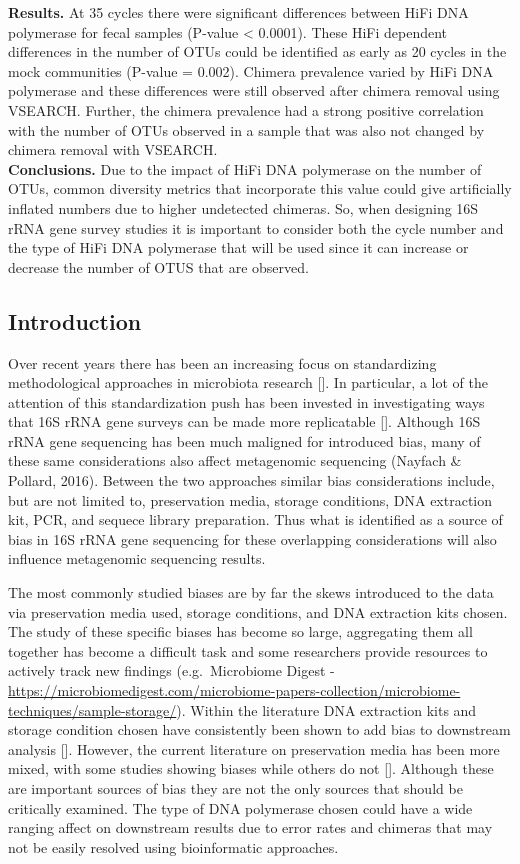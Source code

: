 \documentclass[12pt,]{article}
\begin{document}
\textbf{Results.} At 35 cycles there were significant differences
between HiFi DNA polymerase for fecal samples (P-value \textless{}
0.0001). These HiFi dependent differences in the number of OTUs could be
identified as early as 20 cycles in the mock communities (P-value =
0.002). Chimera prevalence varied by HiFi DNA polymerase and these
differences were still observed after chimera removal using VSEARCH.
Further, the chimera prevalence had a strong positive correlation with
the number of OTUs observed in a sample that was also not changed by
chimera removal with VSEARCH.\\
\textbf{Conclusions.} Due to the impact of HiFi DNA polymerase on the
number of OTUs, common diversity metrics that incorporate this value
could give artificially inflated numbers due to higher undetected
chimeras. So, when designing 16S rRNA gene survey studies it is
important to consider both the cycle number and the type of HiFi DNA
polymerase that will be used since it can increase or decrease the
number of OTUS that are observed.

\newpage

\subsection{Introduction}\label{introduction}

Over recent years there has been an increasing focus on standardizing
methodological approaches in microbiota research {[}{]}. In particular,
a lot of the attention of this standardization push has been invested in
investigating ways that 16S rRNA gene surveys can be made more
replicatable {[}{]}. Although 16S rRNA gene sequencing has been much
maligned for introduced bias, many of these same considerations also
affect metagenomic sequencing (Nayfach \& Pollard, 2016). Between the
two approaches similar bias considerations include, but are not limited
to, preservation media, storage conditions, DNA extraction kit, PCR, and
sequece library preparation. Thus what is identified as a source of bias
in 16S rRNA gene sequencing for these overlapping considerations will
also influence metagenomic sequencing results.

The most commonly studied biases are by far the skews introduced to the
data via preservation media used, storage conditions, and DNA extraction
kits chosen. The study of these specific biases has become so large,
aggregating them all together has become a difficult task and some
researchers provide resources to actively track new findings
(e.g.~Microbiome Digest -
\url{https://microbiomedigest.com/microbiome-papers-collection/microbiome-techniques/sample-storage/}).
Within the literature DNA extraction kits and storage condition chosen
have consistently been shown to add bias to downstream analysis {[}{]}.
However, the current literature on preservation media has been more
mixed, with some studies showing biases while others do not {[}{]}.
Although these are important sources of bias they are not the only
sources that should be critically examined. The type of DNA polymerase
chosen could have a wide ranging affect on downstream results due to
error rates and chimeras that may not be easily resolved using
bioinformatic approaches.
\end{document}
